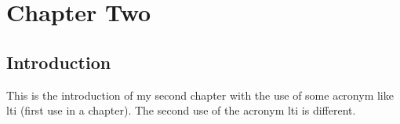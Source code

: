 \chapter{Chapter Two}
\label{Chap2}

\section{Introduction}

This is the introduction of my second chapter with the use of some acronym like \gls{lti} (first use in a chapter). The second use of the acronym \gls{lti} is different.
